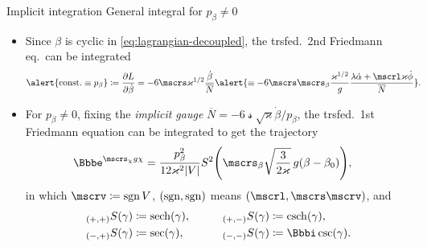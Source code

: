 \documentclass[9pt]{beamer}
\begin{document}
\begin{frame}%
{Implicit integration}%
{General integral for $p_\beta \neq 0$}
\begin{itemize}
\item Since $\beta$ is cyclic in \cref{eq:lagrangian-decoupled},
the trsfed.\ 2nd Friedmann eq.\ can be integrated%
\begin{align}
\alert{\text{const.} \equiv p_\beta} \coloneqq \frpa{L}{\dot{\beta}} &=
-6\mscrs\varkappa^{1/2}\frac{\dot{\beta}}{\overline{N}}
\alert{\equiv
-6\mscrs\mscrs_\beta\frac{\varkappa^{1/2}}{g}
\frac{\lambda\dot{\alpha}+\mscrl\varkappa\dot{\phi}}{\overline{N}}}.
\end{align}

\item For $p_\beta \neq 0$, fixing the \emph{implicit gauge}
$\overline{N} = -6\mscrs\sqrt{\varkappa}\dot{\beta}/p_\beta$, the trsfed.\
1st Friedmann equation \alert{can be integrated to get the trajectory}
\begin{align}
\ee^{\mscrs_\chi g\chi} &=
\frac{p_\beta^2}{12\varkappa^2\vbr{V}}
\rfun{S^2}{\mscrs_\beta \sqrt{\frac{3}{2\varkappa}}\,g \rbr{\beta-\beta_0}},
\end{align}
in which $\mscrv \coloneqq \sgn V$, ${\left(\mathrm{sgn},\mathrm{sgn}\right)}$ means 
$\rbr{\mscrl,\mscrs\mscrv}$, and
\begin{align}
\begin{aligned}
\rfun{{}_{\rbr{+,+}}S}{\gamma} &\coloneqq \rfun{\sech}{\gamma},
&\qquad
\rfun{{}_{\rbr{+,-}}S}{\gamma} &\coloneqq \rfun{\csch}{\gamma},\\
\rfun{{}_{\rbr{-,+}}S}{\gamma} &\coloneqq \rfun{\sec}{\gamma},
&\qquad
\rfun{{}_{\rbr{-,-}}S}{\gamma} &\coloneqq \rfun{\ii\csc}{\gamma}.\\
\end{aligned}
\end{align}
\end{itemize}
\end{frame}
\end{document}
